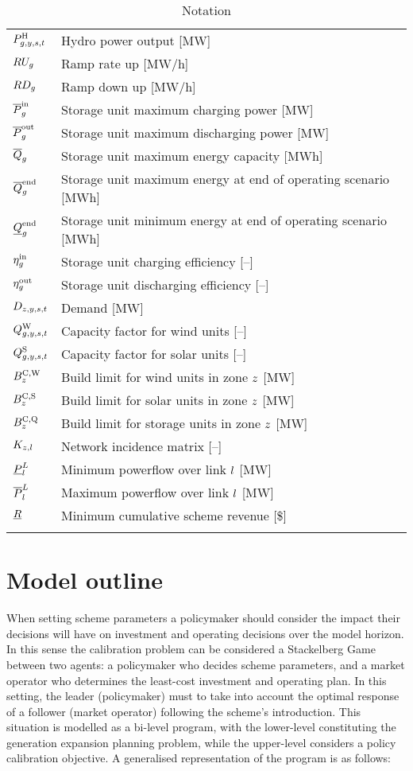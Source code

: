 \documentclass{article}
\begin{document}
\begin{longtable}{ p{}  p{}}
		$P^{\mathrm{H}}_{g,y,s,t}$ & Hydro power output [MW]\\
		$RU_{g}$ & Ramp rate up [MW/h]\\
		$RD_{g}$ & Ramp down up [MW/h]\\
		$\overline{P}^{\mathrm{in}}_{g}$ & Storage unit maximum charging power [MW]\\
		$\overline{P}^{\mathrm{out}}_{g}$ & Storage unit maximum discharging power [MW]\\
		$\overline{Q}_{g}$ & Storage unit maximum energy capacity [MWh]\\
		$\overline{Q}^{\mathrm{end}}_{g}$ & Storage unit maximum energy at end of operating scenario [MWh]\\
		$\underline{Q}^{\mathrm{end}}_{g}$ & Storage unit minimum energy at end of operating scenario [MWh]\\
		$\eta_{g}^{\mathrm{in}}$ & Storage unit charging efficiency [--]\\
		$\eta_{g}^{\mathrm{out}}$ & Storage unit discharging efficiency [--]\\
		$D_{z,y,s,t}$ & Demand [MW]\\
		$Q_{g,y,s,t}^{\mathrm{W}}$ & Capacity factor for wind units [--]\\
		$Q_{g,y,s,t}^{\mathrm{S}}$ & Capacity factor for solar units [--]\\
		$B^{\mathrm{C,\mathrm{W}}}_{z}$ & Build limit for wind units in zone $z$ [MW]\\
		$B^{\mathrm{C,\mathrm{S}}}_{z}$ & Build limit for solar units in zone $z$ [MW]\\
		$B^{\mathrm{C,\mathrm{Q}}}_{z}$ & Build limit for storage units in zone $z$ [MW]\\
		$K_{z,l}$ & Network incidence matrix [--]\\
		$\underline{P}_{l}^{L}$ & Minimum powerflow over link $l$ [MW]\\
		$\overline{P}_{l}^{L}$ & Maximum powerflow over link $l$ [MW]\\
		$\underline{R}$ & Minimum cumulative scheme revenue [\$]\\
		\hline
		\caption{Notation}
	\end{longtable}

\section{Model outline}
When setting scheme parameters a policymaker should consider the impact their decisions will have on investment and operating decisions over the model horizon. In this sense the calibration problem can be considered a Stackelberg Game between two agents: a policymaker who decides scheme parameters, and a market operator who determines the least-cost investment and operating plan. In this setting, the leader (policymaker) must to take into account the optimal response of a follower (market operator) following the scheme's introduction. This situation is modelled as a bi-level program, with the lower-level constituting the generation expansion planning problem, while the upper-level considers a policy calibration objective. A generalised representation of the program is as follows:
\end{document}
